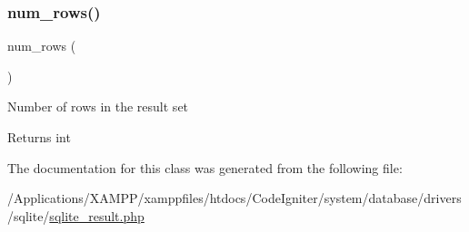 \subsubsection{\texorpdfstring{num\+\_\+rows()}{num\_rows()}}
{\footnotesize\ttfamily num\+\_\+rows (\begin{DoxyParamCaption}{ }\end{DoxyParamCaption})}

Number of rows in the result set

\begin{DoxyReturn}{Returns}
int 
\end{DoxyReturn}


The documentation for this class was generated from the following file\+:\begin{DoxyCompactItemize}
\item 
/\+Applications/\+X\+A\+M\+P\+P/xamppfiles/htdocs/\+Code\+Igniter/system/database/drivers/sqlite/\mbox{\hyperlink{sqlite__result_8php}{sqlite\+\_\+result.\+php}}\end{DoxyCompactItemize}
